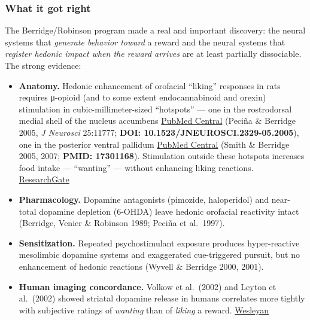 \subsubsection{What it got right}\label{01_dopamine_substrate-what-it-got-right}

The Berridge/Robinson program made a real and important discovery: the neural systems that \emph{generate behavior toward} a reward and the neural systems that \emph{register hedonic impact when the reward arrives} are at least partially dissociable. The strong evidence:

\begin{itemize}
\tightlist
\item
  \textbf{Anatomy.} Hedonic enhancement of orofacial ``liking'' responses in rats requires μ-opioid (and to some extent endocannabinoid and orexin) stimulation in cubic-millimeter-sized ``hotspots'' --- one in the rostrodorsal medial shell of the nucleus accumbens \href{https://pmc.ncbi.nlm.nih.gov/articles/PMC6673729/}{PubMed Central} (Peciña \& Berridge 2005, \emph{J Neurosci} 25:11777; \textbf{DOI: 10.1523/JNEUROSCI.2329-05.2005}), one in the posterior ventral pallidum \href{https://pmc.ncbi.nlm.nih.gov/articles/PMC6673729/}{PubMed Central} (Smith \& Berridge 2005, 2007; \textbf{PMID: 17301168}). Stimulation outside these hotspots increases food intake --- ``wanting'' --- without enhancing liking reactions. \href{https://www.researchgate.net/publication/6504618_Opioid_Limbic_Circuit_for_Reward_Interaction_between_Hedonic_Hotspots_of_Nucleus_Accumbens_and_Ventral_Pallidum}{ResearchGate}
\item
  \textbf{Pharmacology.} Dopamine antagonists (pimozide, haloperidol) and near-total dopamine depletion (6-OHDA) leave hedonic orofacial reactivity intact (Berridge, Venier \& Robinson 1989; Peciña et al.~1997).
\item
  \textbf{Sensitization.} Repeated psychostimulant exposure produces hyper-reactive mesolimbic dopamine systems and exaggerated cue-triggered pursuit, but no enhancement of hedonic reactions (Wyvell \& Berridge 2000, 2001).
\item
  \textbf{Human imaging concordance.} Volkow et al.~(2002) and Leyton et al.~(2002) showed striatal dopamine release in humans correlates more tightly with subjective ratings of \emph{wanting} than of \emph{liking} a reward. \href{https://robinsonlab.research.wesleyan.edu/files/2014/01/Robinson-2015-Curr-Top-Behav-Neurosci.pdf}{Wesleyan}
\end{itemize}

